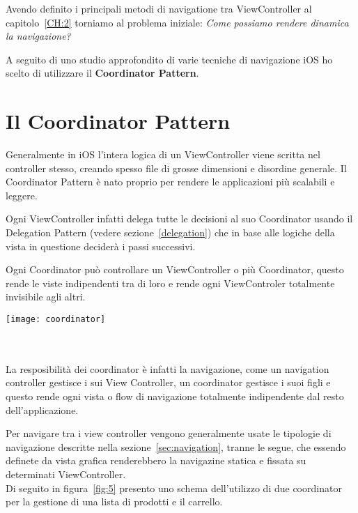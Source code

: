 

Avendo definito i principali metodi di navigatione tra ViewController al capitolo~\ref{CH:2} torniamo al problema iniziale:
\textit{Come possiamo rendere dinamica la navigazione?}

A seguito di uno studio approfondito di varie tecniche di navigazione iOS ho scelto di utilizzare il
\textbf{Coordinator Pattern}\cite{coordinatorpattern}.

\section{Il Coordinator Pattern}

Generalmente in iOS l'intera logica di un ViewController viene scritta nel controller stesso, creando spesso
file di grosse dimensioni e disordine generale. Il Coordinator Pattern è nato proprio per rendere 
le applicazioni più scalabili e leggere. 

Ogni ViewController infatti delega tutte le decisioni al suo Coordinator usando il Delegation Pattern (vedere sezione~\ref{delegation}) che in base alle logiche
della vista in questione deciderà i passi successivi.

Ogni Coordinator può controllare un ViewController o più Coordinator, questo rende le viste
indipendenti tra di loro e rende ogni ViewControler totalmente invisibile agli altri.\\

\begin{minipage}{\linewidth}
    \centering
    \texttt{[image: coordinator]}
    \label{fig:4}
\end{minipage}\\ \\

La resposibilità dei coordinator è infatti la navigazione, come un navigation controller gestisce i sui View Controller, un coordinator gestisce
i suoi figli e questo rende ogni vista o flow di navigazione totalmente indipendente dal resto dell'applicazione.

Per navigare tra i view controller vengono generalmente usate le tipologie di navigazione
descritte nella sezione~\ref{sec:navigation}, tranne le segue, che essendo definete da vista grafica renderebbero
la navigazine statica e fissata su determinati ViewController. \\

Di seguito in figura~\ref{fig:5} presento uno schema dell'utilizzo di due coordinator
per la gestione di una lista di prodotti e il carrello. \\

